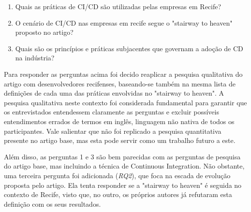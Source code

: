\begin{enumerate}
\item Quais as práticas de CI/CD são utilizadas pelas empresas em Recife?
\item O cenário de CI/CD nas empresas em recife segue o "stairway to heaven" proposto no artigo?
\item Quais são os princípios e práticas subjacentes que governam a adoção de CD na indústria?
\end{enumerate}

Para responder as perguntas acima foi decido reaplicar a pesquisa qualitativa do artigo \cite{empiricalStudy2016} com desenvolvedores recifenses, baseando-se também na mesma lista de definições de cada uma das práticas envolvidas no "stairway to heaven". A pesquisa qualitativa neste contexto foi considerada fundamental para garantir que os entrevistados entendessem claramente as perguntas e excluir possíveis entendimentos errados de termos em inglês, linguagem não nativa de todos os participantes. Vale salientar que não foi replicado a pesquisa quantitativa presente no artigo base, mas esta pode servir como um trabalho futuro a este.

Além disso, as perguntas 1 e 3 são bem parecidas com as perguntas de pesquisa do artigo base, mas incluindo a técnica de Continuous Integration. Não obstante, uma terceira pergunta foi adicionada (\emph{RQ2}), que foca na escada de evolução proposta pelo artigo. Ela tenta responder se a "stairway to heaven" é seguida no contexto de Recife, visto que, no outro, os próprios autores já refutaram esta definição com os seus resultados.


